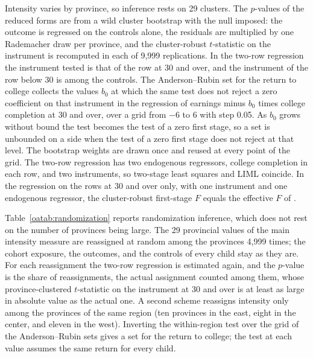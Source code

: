 \documentclass[11pt]{article}
\numberwithin{equation}{section}
\begin{document}
Intensity varies by province, so inference rests on 29 clusters. The
$p$-values of the reduced forms are from a wild cluster bootstrap with
the null imposed: the outcome is regressed on the controls alone, the
residuals are multiplied by one Rademacher draw per province, and the cluster-robust $t$-statistic on the instrument is recomputed in each
of 9,999 replications. In the two-row regression the instrument tested is that of the row at 30 and over, and the instrument of the row
below 30 is among the controls. The Anderson--Rubin set for the return to college collects the values $b_0$ at which the same test does not
reject a zero coefficient on that instrument in the regression of
earnings minus $b_0$ times college completion at 30 and over, over a
grid from $-6$ to 6 with step 0.05. As $b_0$ grows without bound the test becomes the test of a zero first stage, so a set is unbounded on a side when the test of a zero first stage does not reject at that level. The bootstrap weights are
drawn once and reused at every point of the grid. The two-row
regression has two endogenous regressors, college completion in each
row, and two instruments, so two-stage least squares and LIML coincide.
In the regression on the rows at 30 and over only, with one instrument
and one endogenous regressor, the cluster-robust first-stage $F$ equals
the effective $F$ of \citet{OleaPflueger2013}.

Table~\ref{oatab:randomization} reports randomization inference, which does not rest on the number of provinces being large. The 29 provincial values of the main intensity measure are reassigned at random among the provinces 4,999 times; the cohort exposure, the outcomes, and the controls of every child stay as they are. For each reassignment the two-row regression is estimated again, and the $p$-value is the share of reassignments, the actual assignment counted among them, whose province-clustered $t$-statistic on the instrument at 30 and over is at least as large in absolute value as the actual one. A second scheme reassigns intensity only among the provinces of the same region (ten provinces in the east, eight in the center, and eleven in the west). Inverting the within-region test over the grid of the Anderson--Rubin sets gives a set for the return to college; the test at each value assumes the same return for every child.
\end{document}
